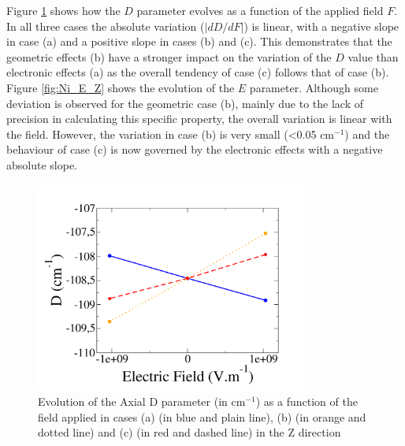 \documentclass[10pt]{report}
\numberwithin{equation}{section}
\begin{document}

Figure \ref{fig:Ni_D_Z} shows how the $D$ parameter evolves as a function of the applied field $F$.
In all three cases the absolute variation ($|dD/dF|$) is linear, with a negative slope in case (a) and a positive slope in cases (b) and (c).
This demonstrates that the geometric effects (b) have a stronger impact on the variation of the $D$ value than electronic effects (a) as the overall tendency of case (c) follows that of case (b).
Figure \ref{fig:Ni_E_Z} shows the evolution of the $E$ parameter.
Although some deviation is observed for the geometric case (b), mainly due to the lack of precision in calculating this specific property, the overall variation is linear with the field.
However, the variation in case (b) is very small (<0.05 cm$^{-1}$) and the behaviour of case (c) is now governed by the electronic effects with a negative absolute slope.

\begin{figure}[!ht]
    \centering
    \includegraphics[width=0.8\textwidth]{Images/D_E_Z.png}
    \caption{Evolution of the Axial D parameter (in cm$^{-1}$) as a function of the field applied in cases (a) (in blue and plain line), (b) (in orange and dotted line) and (c) (in red and dashed line) in the Z direction}
    \label{fig:Ni_D_Z}
\end{figure}
\end{document}
